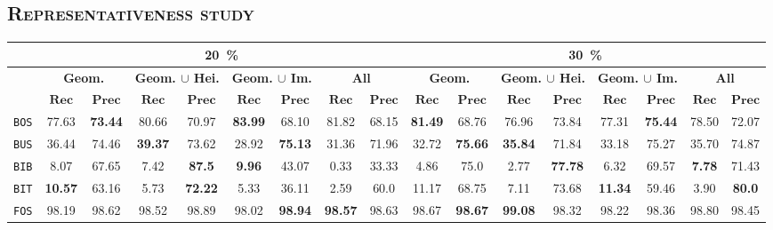     \subsection{\textsc{Representativeness study}}
        \begin{sidewaystable}
            \footnotesize
            \begin{center}
                \begin{tabular}{|c | c c | c c | c c | c c || c c | c c | c c | c c |}
                    \hline
                    & \multicolumn{8}{c||}{\textbf{\SI{20}{\percent}}} & \multicolumn{8}{c|}{\textbf{\SI{30}{\percent}}}\\
                    \hline
                    &\multicolumn{2}{c|}{\textbf{Geom.}} & \multicolumn{2}{c|}{\textbf{Geom. $\cup$ Hei.}} & \multicolumn{2}{c|}{\textbf{Geom. $\cup$ Im.}} & \multicolumn{2}{c||}{\textbf{All}} & \multicolumn{2}{c|}{\textbf{Geom.}} & \multicolumn{2}{c|}{\textbf{Geom. $\cup$ Hei.}} & \multicolumn{2}{c|}{\textbf{Geom. $\cup$ Im.}} & \multicolumn{2}{x{1.5cm}|}{\textbf{All}}\\
                    \cline{2-17}
                    & \(\bm{Rec}\) & \(\bm{Prec}\) &  \(\bm{Rec}\) & \(\bm{Prec}\) &  \(\bm{Rec}\) & \(\bm{Prec}\) &  \(\bm{Rec}\) & \(\bm{Prec}\) & \(\bm{Rec}\) & \(\bm{Prec}\) &  \(\bm{Rec}\) & \(\bm{Prec}\) &  \(\bm{Rec}\) & \(\bm{Prec}\) &  \(\bm{Rec}\) & \(\bm{Prec}\) \\
                    \hline
                    \texttt{BOS} & 77.63 & \textbf{73.44} & 80.66 & 70.97 & \textbf{83.99} & 68.10 & 81.82 & 68.15 & \textbf{81.49} & 68.76 & 76.96 & 73.84 & 77.31 & \textbf{75.44} & 78.50 & 72.07 \\
                    \hline
                    \texttt{BUS} & 36.44 & 74.46 & \textbf{39.37} & 73.62 & 28.92 & \textbf{75.13} & 31.36 & 71.96 & 32.72 & \textbf{75.66} & \textbf{35.84} & 71.84 & 33.18 & 75.27 & 35.70 & 74.87 \\
                    \hline
                    \texttt{BIB} & 8.07 & 67.65 & 7.42 & \textbf{87.5} & \textbf{9.96} & 43.07 & 0.33 & 33.33 & 4.86 & 75.0 & 2.77 & \textbf{77.78} & 6.32 & 69.57 & \textbf{7.78} & 71.43 \\
                    \hline
                    \texttt{BIT} & \textbf{10.57} & 63.16 & 5.73 & \textbf{72.22} & 5.33 & 36.11 & 2.59 & 60.0 & 11.17 & 68.75 & 7.11 & 73.68 & \textbf{11.34} & 59.46 & 3.90 & \textbf{80.0} \\
                    \hline
                    \texttt{FOS} & 98.19 & 98.62 & 98.52 & 98.89 & 98.02 & \textbf{98.94} & \textbf{98.57} & 98.63 & 98.67 & \textbf{98.67} & \textbf{99.08} & 98.32 & 98.22 & 98.36 & 98.80 & 98.45 \\

\end{tabular}
\end{center}
\end{sidewaystable}
